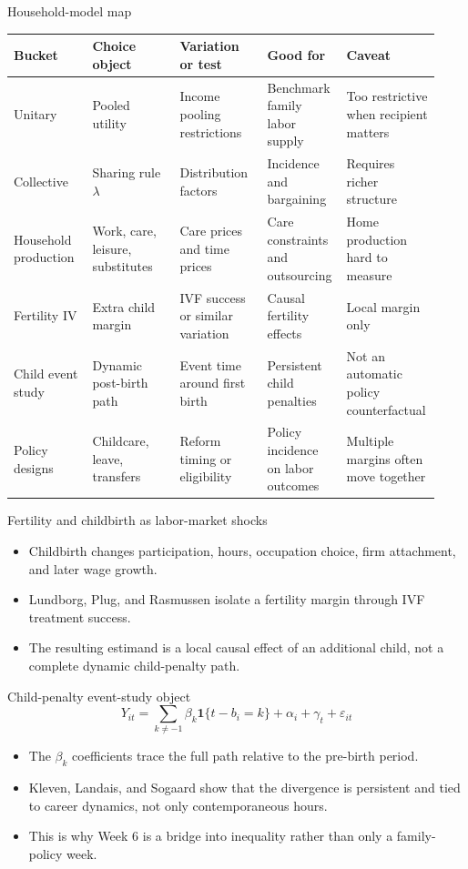 \documentclass[aspectratio=169,11pt]{beamer}
\begin{document}
\begin{frame}{Household-model map}
\scriptsize
\begin{tabular}{p{0.18\linewidth} p{0.20\linewidth} p{0.20\linewidth} p{0.18\linewidth} p{0.17\linewidth}}
\toprule
Bucket & Choice object & Variation or test & Good for & Caveat \\
\midrule
Unitary & Pooled utility & Income pooling restrictions & Benchmark family labor supply & Too restrictive when recipient matters \\
Collective & Sharing rule \(\lambda\) & Distribution factors & Incidence and bargaining & Requires richer structure \\
Household production & Work, care, leisure, substitutes & Care prices and time prices & Care constraints and outsourcing & Home production hard to measure \\
Fertility IV & Extra child margin & IVF success or similar variation & Causal fertility effects & Local margin only \\
Child event study & Dynamic post-birth path & Event time around first birth & Persistent child penalties & Not an automatic policy counterfactual \\
Policy designs & Childcare, leave, transfers & Reform timing or eligibility & Policy incidence on labor outcomes & Multiple margins often move together \\
\bottomrule
\end{tabular}
\end{frame}

\begin{frame}{Fertility and childbirth as labor-market shocks}
\begin{itemize}
    \item Childbirth changes participation, hours, occupation choice, firm attachment, and later wage growth.
    \item Lundborg, Plug, and Rasmussen isolate a fertility margin through IVF treatment success.
    \item The resulting estimand is a local causal effect of an additional child, not a complete dynamic child-penalty path.
\end{itemize}
\end{frame}

\begin{frame}{Child-penalty event-study object}
\[
Y_{it} = \sum_{k \neq -1} \beta_k \mathbf{1}\{t - b_i = k\} + \alpha_i + \gamma_t + \varepsilon_{it}
\]

\begin{itemize}
    \item The \(\beta_k\) coefficients trace the full path relative to the pre-birth period.
    \item Kleven, Landais, and Sogaard show that the divergence is persistent and tied to career dynamics, not only contemporaneous hours.
    \item This is why Week 6 is a bridge into inequality rather than only a family-policy week.
\end{itemize}
\end{frame}
\end{document}
